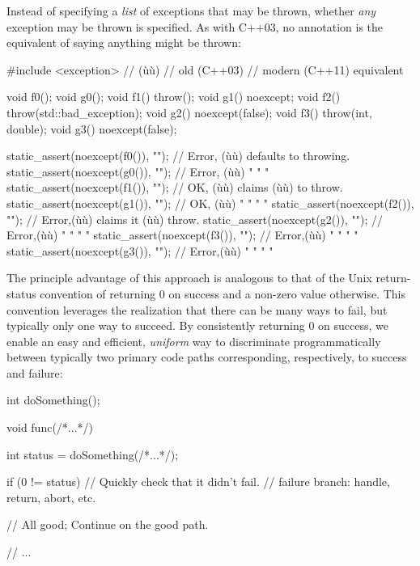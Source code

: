 \noindent Instead of specifying a \emph{list} of exceptions that may be thrown,
whether \emph{any} exception may be thrown is specified. As with C++03,
no annotation is the equivalent of saying anything might be thrown:

\begin{emcppslisting}
#include <exception>  // (ù{}ù)
// old (C++03)                         // modern (C++11) equivalent

void f0();                             void g0();
void f1() throw();                     void g1() noexcept;
void f2() throw(std::bad_exception);   void g2() noexcept(false);
void f3() throw(int, double);          void g3() noexcept(false);

static_assert(noexcept(f0()), "");  // Error, (ù{}ù) defaults to throwing.
static_assert(noexcept(g0()), "");  // Error, (ù{}ù)     "     "     "
static_assert(noexcept(f1()), "");  // OK,    (ù{}ù) claims (ù{}ù) to throw.
static_assert(noexcept(g1()), "");  // OK,    (ù{}ù)    "    "   "   "
static_assert(noexcept(f2()), "");  // Error,(ù{}ù) claims it (ù{}ù) throw.
static_assert(noexcept(g2()), "");  // Error,(ù{}ù)    "    "  "    "
static_assert(noexcept(f3()), "");  // Error,(ù{}ù)    "    "  "    "
static_assert(noexcept(g3()), "");  // Error,(ù{}ù)    "    "  "    "
\end{emcppslisting}
    

\noindent The principle advantage of this approach is analogous to that of the
Unix return-status convention of returning 0 on success and a non-zero
value otherwise. This convention leverages the realization that there
can be many ways to fail, but typically only one way to succeed. By
consistently returning 0 on success, we enable an easy and efficient,
\emph{uniform} way to discriminate programmatically between typically
two primary code paths corresponding, respectively, to success and
failure:

\begin{emcppshiddenlisting}[emcppsbatch=e5]
int doSomething();
\end{emcppshiddenlisting}
\begin{emcppslisting}[emcppsbatch=e5]
void func(/*...*/)
{
    int status = doSomething(/*...*/);

    if (0 != status)  // Quickly check that it didn't fail.
    {
        // failure branch: handle, return, abort, etc.
    }

    // All good; Continue on the good path.

    // ...
}
\end{emcppslisting}
    

